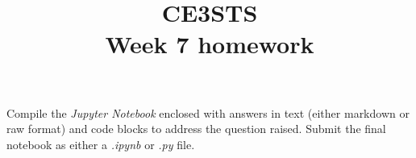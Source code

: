 \documentclass{article}
\title{CE3STS \\ Week 7 homework}
\author{}
\begin{document}
\maketitle

Compile the \textit{Jupyter Notebook} enclosed with answers in text (either markdown or raw format) and code blocks to address the question raised. Submit the final notebook as either a \textit{.ipynb} or \textit{.py} file.
\end{document}
